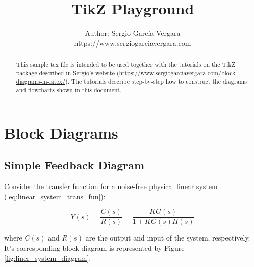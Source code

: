 \documentclass[11pt]{article}
\begin{document}

\title{TikZ Playground}
\author{
  Author: Sergio Garc\'{i}a-Vergara \\
  \small{https://www.sergiogarciavergara.com}
}

\maketitle


\begin{abstract}
  This sample tex file is intended to be used together with the tutorials on the
  TikZ package described in Sergio's website
  (\href{https://www.sergiogarciavergara.com/block-diagrams-in-latex/}{https://www.sergiogarciavergara.com/block-diagrams-in-latex/}). The
  tutorials describe step-by-step how to construct the diagrams and flowcharts
  shown in this document.

\end{abstract}



\section{Block Diagrams}

\subsection{Simple Feedback Diagram}

Consider the transfer function for a noise-free physical linear system
(\ref{eq:linear_system_trans_fun}):

\begin{equation}\label{eq:linear_system_trans_fun}
Y(s) = \frac{C(s)}{R(s)} = \frac{KG(s)}{1 + KG(s)H(s)}
\end{equation}

\noindent
where $C(s)$ and $R(s)$ are the output and input of the system,
respectively. It's corresponding block diagram is represented by Figure
\ref{fig:liner_system_diagram}.
\end{document}
